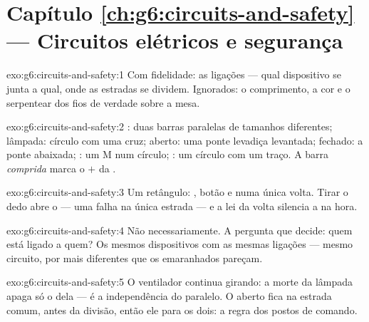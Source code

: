 \section*{Capítulo \ref{ch:g6:circuits-and-safety} --- Circuitos elétricos e segurança}

\begin{solution}{exo:g6:circuits-and-safety:1}
Com fidelidade: as ligações --- qual dispositivo se junta a qual,
onde as estradas se dividem. Ignorados: o comprimento, a cor e o
serpentear dos fios de verdade sobre a mesa.
\end{solution}

\begin{solution}{exo:g6:circuits-and-safety:2}
: duas barras paralelas de tamanhos diferentes; lâmpada: círculo
com uma cruz;  aberto: uma ponte levadiça levantada;
 fechado: a ponte abaixada; : um M num círculo;
: um círculo com um traço. A barra \emph{comprida} marca o
$+$ da .
\end{solution}

\begin{solution}{exo:g6:circuits-and-safety:3}
Um retângulo: , botão e  numa única volta. Tirar o dedo
abre o  --- uma falha na única estrada --- e a lei da
volta silencia a  na hora.
\end{solution}

\begin{solution}{exo:g6:circuits-and-safety:4}
Não necessariamente. A pergunta que decide: quem está ligado a quem?
Os mesmos dispositivos com as mesmas ligações --- mesmo circuito, por
mais diferentes que os emaranhados pareçam.
\end{solution}

\begin{solution}{exo:g6:circuits-and-safety:5}
O ventilador continua girando: a morte da lâmpada apaga só o 
dela --- é a independência do paralelo. O  aberto fica na
estrada comum, antes da divisão, então ele para os dois: a regra dos
postos de comando.
\end{solution}

